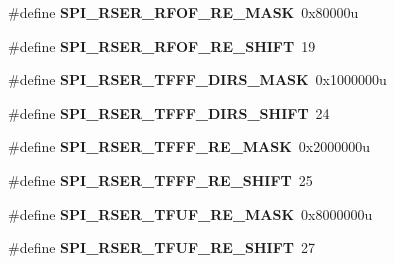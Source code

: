 \begin{DoxyCompactItemize}
\item 
\hypertarget{group___s_p_i___register___masks_ga32d8083bb571fb12a424b1803c596f47}{}\#define {\bfseries S\+P\+I\+\_\+\+R\+S\+E\+R\+\_\+\+R\+F\+O\+F\+\_\+\+R\+E\+\_\+\+M\+A\+S\+K}~0x80000u\label{group___s_p_i___register___masks_ga32d8083bb571fb12a424b1803c596f47}

\item 
\hypertarget{group___s_p_i___register___masks_gab18f888cf02c471809ebc9f807711a13}{}\#define {\bfseries S\+P\+I\+\_\+\+R\+S\+E\+R\+\_\+\+R\+F\+O\+F\+\_\+\+R\+E\+\_\+\+S\+H\+I\+F\+T}~19\label{group___s_p_i___register___masks_gab18f888cf02c471809ebc9f807711a13}

\item 
\hypertarget{group___s_p_i___register___masks_ga01228112dcc4440aa1678eb55b97306e}{}\#define {\bfseries S\+P\+I\+\_\+\+R\+S\+E\+R\+\_\+\+T\+F\+F\+F\+\_\+\+D\+I\+R\+S\+\_\+\+M\+A\+S\+K}~0x1000000u\label{group___s_p_i___register___masks_ga01228112dcc4440aa1678eb55b97306e}

\item 
\hypertarget{group___s_p_i___register___masks_ga9f1684fdb2e7f9e9adb7afd07a3278da}{}\#define {\bfseries S\+P\+I\+\_\+\+R\+S\+E\+R\+\_\+\+T\+F\+F\+F\+\_\+\+D\+I\+R\+S\+\_\+\+S\+H\+I\+F\+T}~24\label{group___s_p_i___register___masks_ga9f1684fdb2e7f9e9adb7afd07a3278da}

\item 
\hypertarget{group___s_p_i___register___masks_ga1bb1c8b3d77e69e8ea3197b2a26392cb}{}\#define {\bfseries S\+P\+I\+\_\+\+R\+S\+E\+R\+\_\+\+T\+F\+F\+F\+\_\+\+R\+E\+\_\+\+M\+A\+S\+K}~0x2000000u\label{group___s_p_i___register___masks_ga1bb1c8b3d77e69e8ea3197b2a26392cb}

\item 
\hypertarget{group___s_p_i___register___masks_ga6b7e6d97146fb2244a8b1fb870cf980b}{}\#define {\bfseries S\+P\+I\+\_\+\+R\+S\+E\+R\+\_\+\+T\+F\+F\+F\+\_\+\+R\+E\+\_\+\+S\+H\+I\+F\+T}~25\label{group___s_p_i___register___masks_ga6b7e6d97146fb2244a8b1fb870cf980b}

\item 
\hypertarget{group___s_p_i___register___masks_ga245d7987838cad9b4392b051fbd6fb06}{}\#define {\bfseries S\+P\+I\+\_\+\+R\+S\+E\+R\+\_\+\+T\+F\+U\+F\+\_\+\+R\+E\+\_\+\+M\+A\+S\+K}~0x8000000u\label{group___s_p_i___register___masks_ga245d7987838cad9b4392b051fbd6fb06}

\item 
\hypertarget{group___s_p_i___register___masks_ga42ef57e6e872c54f15ba9742f98ea522}{}\#define {\bfseries S\+P\+I\+\_\+\+R\+S\+E\+R\+\_\+\+T\+F\+U\+F\+\_\+\+R\+E\+\_\+\+S\+H\+I\+F\+T}~27\label{group___s_p_i___register___masks_ga42ef57e6e872c54f15ba9742f98ea522}


\end{DoxyCompactItemize}
